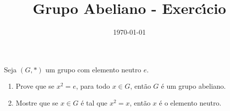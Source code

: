 \documentclass{beamer}
\title{Grupo Abeliano - Exerc{\'\i}cio}
\author[\autor]{\autor}
\institute[\instituto]{\instituto}
\date[]{\today}
\begin{document}


    \begin{frame}
        \begin{exercicio}
            Seja $(G,*)$ um grupo com elemento neutro $e$.

            \vspace{.4cm}
            
            \begin{enumerate}[label=({\alph*})]
                \item Prove que se $x^2 = e$, para todo $x\in G$, ent{\~a}o $G$ {\'e} um grupo abeliano.

                \vspace{.4cm}

                \item Mostre que se $x\in G$ {\'e} tal que $x^2 = x$, ent{\~a}o $x$ {\'e} o elemento neutro.

                \vspace{.4cm}
                
            \end{enumerate}
        \end{exercicio}
    \end{frame}
\end{document}
